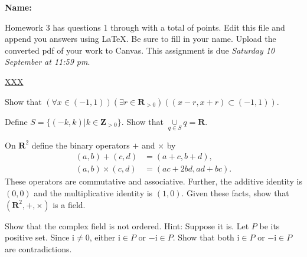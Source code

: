 \documentclass[12pt,fleqn,answers]{exam}
\newcommand{\reals}{\mathbf{R}}
\newcommand{\integers}{\mathbf{Z}}
\newcommand\PM{{\sc pm}}
\newcommand{\quiz}{3}
\newcommand{\term}{Fall}
\newcommand{\due}{Saturday 10 September  at 11:59 \PM}
\begin{document}
\large
\vspace{0.1in}
\noindent{}
{\bf Name:}  \\
\noindent \makebox[3.0truein][l]{\bf Homework   \quiz, \term \/ \the\year}
\vspace{0.1in}

\begin{quote}
    \end{quote}
\noindent  Homework    \quiz\/  has questions 1 through  \numquestions \/ with a total of  \numpoints\/  points.   Edit this file and append you answers using La\TeX. Be sure to fill in your name. Upload the converted pdf of your work to Canvas.   This assignment is due \emph{\due}.

\vspace{0.1in}

\url{XXX}

\begin{questions} 

\question[5] Show that
\(
 \left(\forall x \in (-1,1) \right) 
  \left(\exists r \in \reals_{>0} \right)
    \left( (x-r,x+r) \subset (-1,1) \right)
\).

\begin{solution}  
\end{solution}

\question[5] Define $S = \{(-k,k) | k \in \integers_{>0} \}$. Show that
 $\underset{q \in S}{\cup} q = \reals$.
 \begin{solution}  
 \end{solution}

 \question[5] On $\reals^2$ define the binary operators
 $+$ and $\times$ by
\begin{align*}
  (a,b) + (c,d) &= (a+c,b+d),\\
  (a,b) \times (c,d) &= (ac+2bd, ad+bc).
\end{align*}
These operators are commutative and associative. Further, the
additive identity is $(0,0)$ and the multiplicative identity is
$(1,0)$. Given these facts, show that $(\reals^2, +, \times)$ is a 
field.
\begin{solution}  
\end{solution}

\question[5] Show that the complex field is not ordered. Hint: Suppose 
it is. Let $P$ be its positive set. Since $\mathrm{i} \neq 0$, either
$\mathrm{i} \in P$ or $-\mathrm{i} \in P$. Show that both 
$\mathrm{i} \in P$ or $-\mathrm{i} \in P$ are 
contradictions.
\begin{solution}  
\end{solution}

\end{questions}
\end{document}

